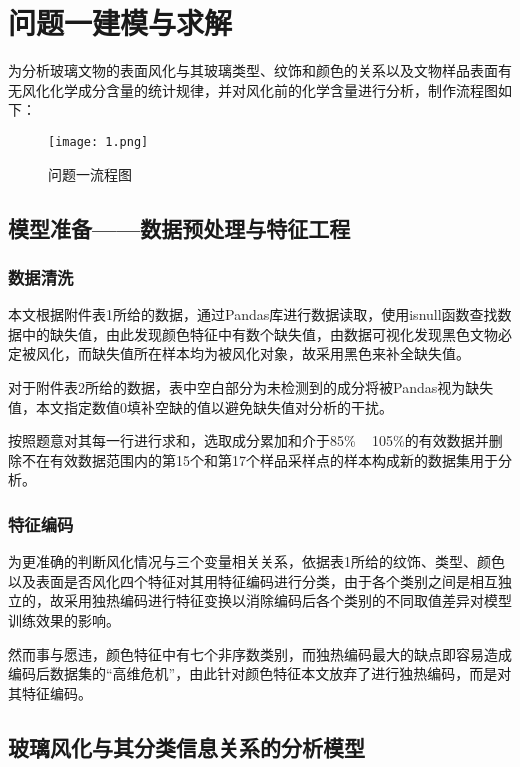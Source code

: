 \section{问题一建模与求解}

为分析玻璃文物的表面风化与其玻璃类型、纹饰和颜色的关系以及文物样品表面有无风化化学成分含量的统计规律，并对风化前的化学含量进行分析，制作流程图如下：

\begin{figure}[H] 
	\centering %
	\texttt{[image: 1.png]} %
	\caption{问题一流程图} %
	\label{Fig.main2} %
\end{figure}

\subsection{模型准备——数据预处理与特征工程}

\subsubsection{数据清洗}

本文根据附件表1所给的数据，通过Pandas库进行数据读取，使用isnull函数查找数据中的缺失值，由此发现颜色特征中有数个缺失值，由数据可视化发现黑色文物必定被风化，而缺失值所在样本均为被风化对象，故采用黑色来补全缺失值。

对于附件表2所给的数据，表中空白部分为未检测到的成分将被Pandas视为缺失值，本文指定数值0填补空缺的值以避免缺失值对分析的干扰。

按照题意对其每一行进行求和，选取成分累加和介于85\% ~ 105\%的有效数据并删除不在有效数据范围内的第15个和第17个样品采样点的样本构成新的数据集用于分析。

\subsubsection{特征编码}

为更准确的判断风化情况与三个变量相关关系，依据表1所给的纹饰、类型、颜色以及表面是否风化四个特征对其用特征编码进行分类，由于各个类别之间是相互独立的，故采用独热编码进行特征变换以消除编码后各个类别的不同取值差异对模型训练效果的影响。

然而事与愿违，颜色特征中有七个非序数类别，而独热编码最大的缺点即容易造成编码后数据集的“高维危机”，由此针对颜色特征本文放弃了进行独热编码，而是对其特征编码。

\subsection{玻璃风化与其分类信息关系的分析模型}

